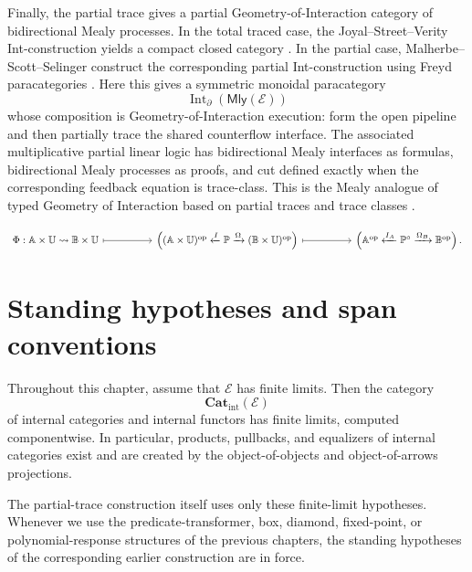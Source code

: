 Finally, the partial trace gives a partial Geometry-of-Interaction category of
bidirectional Mealy processes.  In the total traced case, the
Joyal--Street--Verity Int-construction yields a compact closed category
\cite{JoyalStreetVerityTracedMonoidalCategories}.  In the partial case,
Malherbe--Scott--Selinger construct the corresponding partial Int-construction
using Freyd paracategories
\cite{MalherbeScottSelingerPartiallyTracedCategories}.  Here this gives a
symmetric monoidal paracategory
\[
\operatorname{Int}_{\partial}(\mathsf{Mly}(\mathcal E))
\]
whose composition is Geometry-of-Interaction execution: form the open pipeline
and then partially trace the shared counterflow interface.  The associated
multiplicative partial linear logic has bidirectional Mealy interfaces as
formulas, bidirectional Mealy processes as proofs, and cut defined exactly
when the corresponding feedback equation is trace-class.  This is the Mealy
analogue of typed Geometry of Interaction based on partial traces and trace
classes
\cite{HaghverdiTypedGoI,AbramskyHaghverdiScottGoI}.

\[
\begin{tikzcd}[column sep=huge,row sep=large]
\Phi:\mathbb A\times\mathbb U\rightsquigarrow\mathbb B\times\mathbb U
  \arrow[r, maps to]
&
\left(
(\mathbb A\times\mathbb U)^{\mathrm{op}}
\xleftarrow{I}
\mathbb P
\xrightarrow{\Omega}
(\mathbb B\times\mathbb U)^{\mathrm{op}}
\right)
  \arrow[r, maps to]
&
\left(
\mathbb A^{\mathrm{op}}
\xleftarrow{I_A}
\mathbb P^\circ
\xrightarrow{\Omega_B}
\mathbb B^{\mathrm{op}}
\right).
\end{tikzcd}
\]

\section{Standing hypotheses and span conventions}
\label{sec:partial-trace-standing-hypotheses}

Throughout this chapter, assume that \(\mathcal E\) has finite limits.  Then
the category
\[
\mathbf{Cat}_{\mathrm{int}}(\mathcal E)
\]
of internal categories and internal functors has finite limits, computed
componentwise.  In particular, products, pullbacks, and equalizers of internal
categories exist and are created by the object-of-objects and object-of-arrows
projections.

The partial-trace construction itself uses only these finite-limit hypotheses.
Whenever we use the predicate-transformer, box, diamond, fixed-point, or
polynomial-response structures of the previous chapters, the standing
hypotheses of the corresponding earlier construction are in force.

